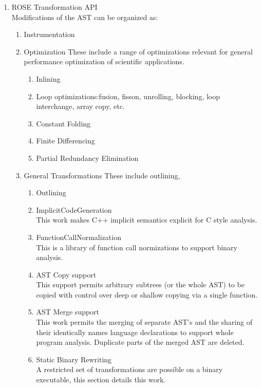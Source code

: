 \begin{enumerate}
\begin{enumerate}
      \item ROSE Transformation API \\
         Modifications of the AST can be organized as:
         \begin{enumerate}
            \item Instrumentation
            \item Optimization
               These include a range of optimizations relevant for general performance
               optimization of scientific applications.
            \begin{enumerate}
               \item Inlining
               \item Loop optimizations:fusion, fisson, unrolling, blocking, loop
                  interchange, array copy, etc.
               \item Constant Folding
               \item Finite Differencing
               \item Partial Redundancy Elimination
            \end{enumerate}

            \item General Transformations
               These include outlining,
            \begin{enumerate}
               \item Outlining
               \item ImplicitCodeGeneration \\
                  This work makes C++ implicit semantics explicit for C style analysis.
               \item FunctionCallNormalization \\
                  This is a library of function call normizations to support binary
                  analysis.
               \item AST Copy support \\
                  This support permits arbitrary subtrees (or the whole AST) to be copied
                  with control over deep or shallow copying via a single function.
               \item AST Merge support \\
                  This work permits the merging of separate AST's and the sharing of their
                  identically names language declarations to support whole program
                  analysis. Duplicate parts of the merged AST are deleted.
               \item Static Binary Rewriting \\
                  A restricted set of transformations are possible on a binary executable,
                  this section details this work.
            \end{enumerate}
         \end{enumerate}


\end{enumerate}
\end{enumerate}
